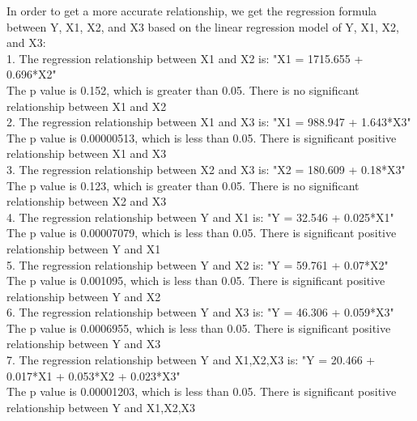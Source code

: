 \documentclass[12pt,letterpaper]{article}
\begin{document}
\begin{itemize}
In order to get a more accurate relationship, we get the regression formula between Y, X1, X2, and X3 based on the linear regression model of Y, X1, X2, and X3: \\

1. The regression relationship between X1 and X2 is: "X1 = 1715.655 + 0.696*X2"\\
The p value is 0.152, which is greater than 0.05. There is no significant relationship between X1 and X2\\

2. The regression relationship between X1 and X3 is: "X1 = 988.947 + 1.643*X3"\\
The p value is 0.00000513, which is less than 0.05. There is significant positive relationship between X1 and X3\\

3. The regression relationship between X2 and X3 is: "X2 = 180.609 + 0.18*X3"\\
The p value is 0.123, which is greater than 0.05. There is no significant relationship between X2 and X3\\

4. The regression relationship between Y and X1 is: "Y = 32.546 + 0.025*X1"\\
The p value is 0.00007079, which is less than 0.05. There is significant positive relationship between Y and X1\\

5. The regression relationship between Y and X2 is: "Y = 59.761 + 0.07*X2"\\
The p value is 0.001095, which is less than 0.05. There is significant positive relationship between Y and X2\\

6. The regression relationship between Y and X3 is: "Y = 46.306 + 0.059*X3"\\
The p value is 0.0006955, which is less than 0.05. There is significant positive relationship between Y and X3\\

7. The regression relationship between Y and X1,X2,X3 is: "Y = 20.466 + 0.017*X1 + 0.053*X2 + 0.023*X3"\\
The p value is 0.00001203, which is less than 0.05. There is significant positive relationship between Y and X1,X2,X3\\
\end{itemize}
\vspace{1cm}
\end{document}

